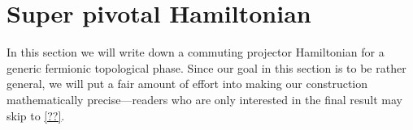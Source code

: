 \documentclass[12pt,a4paper]{article}
\newcommand{\tp}{\otimes}
\newcommand{\kw}[1]{{\color{kwcolor}\footnotesize{(KW) #1}}}
\newcommand{\dave}[1]{{\color{ao(english)}\footnotesize{(DA) #1}}}
\begin{document}

 \section{Super pivotal Hamiltonian}
 \label{Super_pivotal_Hamiltonian}

In this section we will write down a commuting projector Hamiltonian 
for a generic fermionic topological phase. 
Since our goal in this section is to be rather general, we will put a fair amount of effort into making our construction mathematically precise---readers who are only interested in the final result may skip to \ref{??}. 
\end{document}
